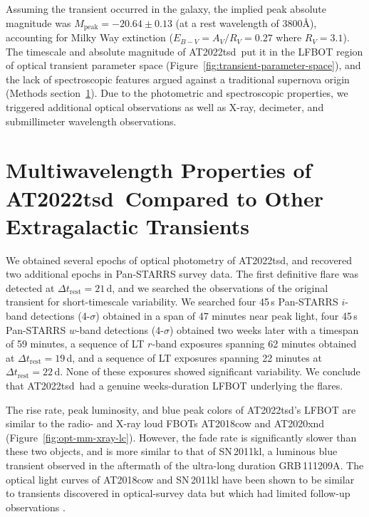 \documentclass{nature_plusfigure}
\newcommand{\at}{AT2022tsd}
\begin{document}
\begin{methods}
Assuming the transient occurred in the galaxy, the implied peak absolute magnitude was $M_{\mathrm{peak}}=-20.64\pm0.13$ (at a rest wavelength of 3800\AA), accounting for Milky Way extinction ($E_{B-V}=A_V/R_V=0.27$ where $R_V=3.1$)\cite{Finkbeiner1999,Schlegel1998,Schlafly2011}.
The timescale and absolute magnitude of \at\ put it in the LFBOT region of optical transient parameter space (Figure~\ref{fig:transient-parameter-space}), and the lack of spectroscopic features argued against a traditional supernova origin (Methods section~\ref{sec:multiwavelength-properties}). Due to the photometric and spectroscopic properties, we triggered additional optical observations as well as X-ray, decimeter, and submillimeter wavelength observations.

\section{Multiwavelength Properties of \at\ Compared to Other Extragalactic Transients}
\label{sec:multiwavelength-properties}

We obtained several epochs of optical photometry of \at, and recovered two additional epochs in Pan-STARRS survey data.
The first definitive flare was detected at $\Delta t_\mathrm{rest}=21$\,d, and we searched the observations of the original transient for short-timescale variability.
We searched four 45\,s Pan-STARRS $i$-band detections (4-$\sigma$) obtained in a span of 47 minutes near peak light,
four 45\,s Pan-STARRS $w$-band detections (4-$\sigma$) obtained two weeks later with a timespan of 59 minutes,
a sequence of LT $r$-band exposures spanning 62 minutes obtained at $\Delta t_\mathrm{rest}=19\,$d,
and a sequence of LT exposures spanning 22 minutes at $\Delta t_\mathrm{rest}=22$\,d.
None of these exposures showed significant variability.
We conclude that \at\ had a genuine weeks-duration LFBOT underlying the flares.

The rise rate, peak luminosity, and blue peak colors of \at's LFBOT are similar to the radio- and X-ray loud FBOTs AT2018cow and AT2020xnd (Figure~\ref{fig:opt-mm-xray-lc}). However, the fade rate is significantly slower than these two objects, and is more similar to that of SN\,2011kl, a luminous blue transient observed in the aftermath of the ultra-long duration GRB\,111209A\cite{Greiner2015}.
The optical light curves of AT2018cow and SN\,2011kl have been shown to be similar to transients discovered in optical-survey data but which had limited follow-up observations \cite{Arcavi2016,Pursiainen2018,Drout2014}.


\end{methods}
\end{document}
